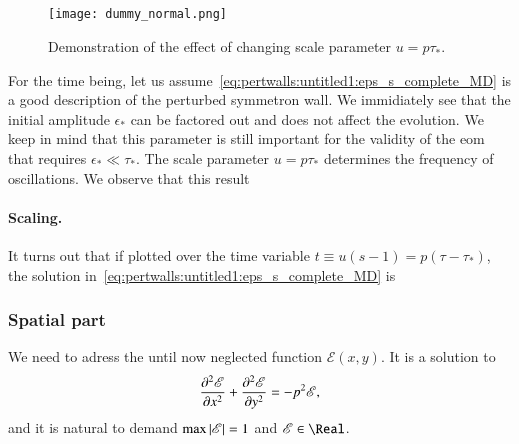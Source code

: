     
    

    

\subsection{}
    \begin{figure}
        \centering
        \texttt{[image: dummy\_normal.png]}
        \caption{Demonstration of the effect of changing scale parameter $u=p\tau_\ast$.}  
    \end{figure}
    For the time being, let us assume~\cref{eq:pertwalls:untitled1:eps_s_complete_MD} is a good description of the perturbed symmetron wall. We immidiately see that the initial amplitude $\epsilon_\ast$ can be factored out and does not affect the evolution. We keep in mind that this parameter is still important for the validity of the eom that requires $\epsilon_\ast \ll \tau_\ast$. 
    The scale parameter $u=p\tau_\ast$ determines the frequency of oscillations. We observe that this result 
    
    \paragraph{Scaling.} %
    It turns out that if plotted over the time variable $t\equiv u(s-1)=p(\tau-\tau_\ast)$, the solution in~\cref{eq:pertwalls:untitled1:eps_s_complete_MD} is 

    \subsubsection{Spatial part}
        We need to adress the until now neglected function $\mathscr{E}(x,y)$. It is a solution to
        \begin{equation}
            \pdv[2]{\mathscr{E}}{x} + \pdv[2]{\mathscr{E}}{y} = -p^2 \mathscr{E},
        \end{equation}
        and it is natural to demand $\max{\abs{\mathscr{E}}} = 1$ and $\mathscr{E}\in\Real$. 






